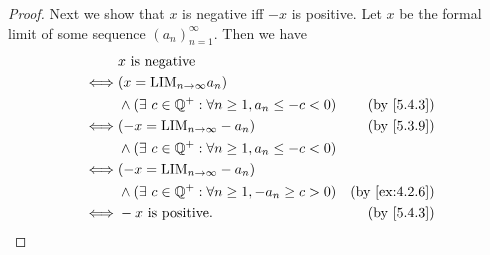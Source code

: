\begin{proof}
  Next we show that \(x\) is negative iff \(-x\) is positive.
  Let \(x\) be the formal limit of some sequence \((a_n)_{n = 1}^{\infty}\).
  Then we have
  \begin{align*}
         & x \text{ is negative}                                                                         \\
    \iff & (x = \text{LIM}_{n \to \infty} a_n)                                                           \\
         & \land (\exists\ c \in \Q^+ : \forall n \geq 1, a_n \leq -c < 0) & \text{(by \cref{5.4.3})}    \\
    \iff & (-x = \text{LIM}_{n \to \infty} -a_n)                           & \text{(by \cref{5.3.9})}    \\
         & \land (\exists\ c \in \Q^+ : \forall n \geq 1, a_n \leq -c < 0)                               \\
    \iff & (-x = \text{LIM}_{n \to \infty} -a_n)                                                         \\
         & \land (\exists\ c \in \Q^+ : \forall n \geq 1, -a_n \geq c > 0) & \text{(by \cref{ex:4.2.6})} \\
    \iff & -x \text{ is positive}.                                         & \text{(by \cref{5.4.3})}
  \end{align*}


\end{proof}
